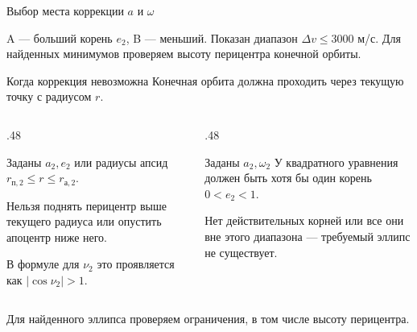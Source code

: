 \documentclass[11pt,aspectratio=169,t]{beamer}
\begin{document}
\begin{frame}{Выбор места коррекции $a$ и $\omega$}
\centering\par
\smallskip\raggedright
A --- больший корень $e_2$, B --- меньший. Показан диапазон $\Delta v\le3000$ м/с.\newline
Для найденных минимумов проверяем высоту перицентра конечной орбиты.
\end{frame}

\begin{frame}{Когда коррекция невозможна}
\justifying
Конечная орбита должна проходить через текущую точку с радиусом $r$.
\begin{columns}[T,onlytextwidth]
\begin{column}{.48\textwidth}
\begin{block}{Заданы $a_2,e_2$ или радиусы апсид}
\centering
$r_{\text{п},2}\le r\le r_{\text{а},2}$.
\end{block}
\justifying
Нельзя поднять перицентр выше текущего радиуса или опустить апоцентр ниже него.
\par\medskip
В формуле для $\nu_2$ это проявляется как $|\cos\nu_2|>1$.
\end{column}
\begin{column}{.48\textwidth}
\begin{block}{Заданы $a_2,\omega_2$}
\justifying
У квадратного уравнения должен быть хотя бы один корень $0<e_2<1$.
\end{block}
\justifying
Нет действительных корней или все они вне этого диапазона --- требуемый эллипс не существует.
\end{column}
\end{columns}
\medskip
\justifying
Для найденного эллипса проверяем ограничения, в том числе высоту перицентра.
\end{frame}
\end{document}
